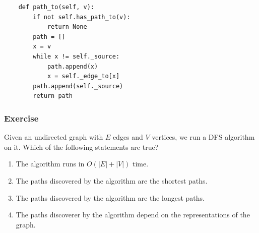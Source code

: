 \documentclass[aspectratio=169, 14pt]{beamer}
\begin{document}
\begin{frame}[fragile]
	\begin{verbatim}
    def path_to(self, v):
        if not self.has_path_to(v):
            return None
        path = []
        x = v
        while x != self._source:
            path.append(x)
            x = self._edge_to[x]
        path.append(self._source)
        return path
  \end{verbatim}
\end{frame}

\begin{frame}[fragile]
	\frametitle{Exercise}
	Given an undirected graph with $E$ edges and $V$ vertices, we run a DFS algorithm on it. Which of the following statements are true?

	\begin{enumerate}
		\item The algorithm runs in $O(|E| + |V|)$ time.
		\item The paths discovered by the algorithm are the shortest paths.
		\item The paths discovered by the algorithm are the longest paths.
		\item The paths discoverer by the algorithm depend on the representations of the graph.
	\end{enumerate}
\end{frame}
\end{document}
